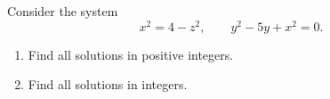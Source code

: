 Consider the system
\[x^2=4-z^2,\qquad y^2-5y+x^2=0 .\]
\begin{enumerate}
\item[(a)] Find all solutions in positive integers.
\item[(b)] Find all solutions in integers.
\end{enumerate}
